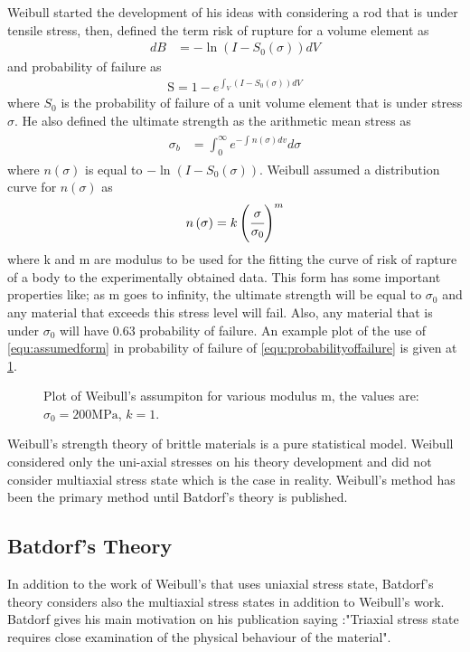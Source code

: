 \documentclass[]{article}
\begin{document}
Weibull started the development of his ideas with considering a rod that is under tensile stress, then, defined the term risk of rupture for a volume element as
\begin{align}
d B &= -\ln{\left(I-S_0\left(\sigma\right)\right)}d V
\end{align}
and probability of failure as
\begin{align}
\mathrm{S}=1-e^{\int_{V}^{}\left(I- S_0\left(\sigma\right)\right)dV}
\label{equ:probabilityoffailure}
\end{align}
where $S_0$ is the probability of failure of a unit volume element that is under stress $\sigma$.  He also defined the ultimate strength as the arithmetic mean stress as
\begin{align}
\begin{split}
\sigma_{b} &= \int_{0}^{\infty}{e^{-\int_{}^{}{n\left(\sigma\right)dv}}d\sigma}
\end{split}
\end{align}
where $n\left(\sigma\right)$ is equal to $-\ln{\left(I-S_0\left(\sigma\right)\right)}$. Weibull assumed a distribution curve for $n\left(\sigma\right)$ as
\begin{align}
n\left(\sigma\right)=k\left(\cfrac{\sigma}{\sigma_0}\right)^m
\label{equ:assumedform}
\end{align}
where k and m are modulus to be used for the fitting the curve of risk of rapture of a body to the experimentally obtained data. This form has some important properties like; as m goes to infinity, the ultimate strength will be equal to $\sigma_0$ and any material that exceeds this stress level will fail. Also, any material that is under $\sigma_0$ will have $0.63$ probability of failure. An example plot of the use of \cref{equ:assumedform} in probability of failure of \cref{equ:probabilityoffailure} is given at \cref{fig:weibullsample}.
\begin{figure}[ht!]
\centering

\caption{Plot of Weibull's assumpiton for various modulus m,  the values are: $\sigma_0=200 \mathrm{MPa}$, $k=1$.}
\label{fig:weibullsample}
\end{figure}

Weibull's strength theory of brittle materials is a pure statistical model. Weibull considered only the uni-axial stresses on his theory development and did not consider multiaxial stress state which is the case in reality. Weibull's  method has been the primary method until Batdorf's theory is published\cite{batdorf}. 
\subsection*{Batdorf's Theory}
In addition to the work of Weibull's that uses uniaxial stress state, Batdorf's theory considers also the multiaxial stress states in addition to Weibull's work\cite{batdorf}. Batdorf gives his main motivation on his publication saying :"Triaxial stress state requires close examination of the physical behaviour of the material".
\end{document}
